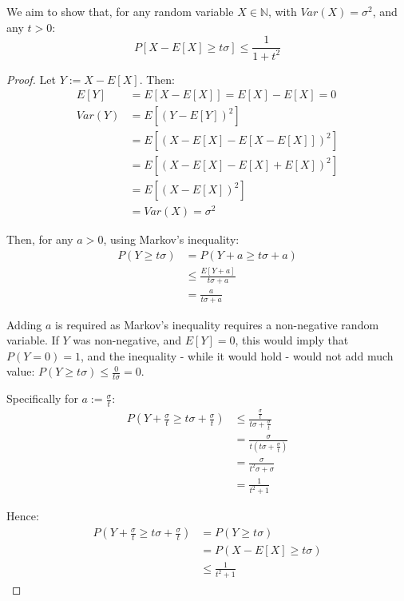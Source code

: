 \documentclass[a4paper]{scrreprt}
\begin{document}
We aim to show that, for any random variable $X \in \mathbb{N}$, with $Var(X) = \sigma^2$, and any $t > 0$:
\[
	P[X - E[X] \geq t \sigma] \leq \frac{1}{1 + t^2}
\]

\begin{proof}
	Let $Y := X - E[X]$. Then:
	\begin{align*}
		E[Y] & = E[X - E[X]] = E[X] - E[X] = 0 \\
		Var(Y) & = E[(Y - E[Y])^2] \\
		       & = E[(X - E[X] - E[X - E[X]])^2] \\
		       & = E[(X - E[X] - E[X] + E[X])^2] \\
		       & = E[(X - E[X])^2] \\
		       & = Var(X) = \sigma^2
	\end{align*}

	Then, for any $a > 0$, using Markov's inequality:
	\begin{align*}
		P(Y \geq t \sigma) & = P(Y + a \geq t \sigma + a) \\
				   & \leq \frac{E[Y + a]}{t \sigma + a} \\
		     & = \frac{a}{t \sigma + a}
	\end{align*}

	Adding $a$ is required as Markov's inequality requires a non-negative
	random variable. If $Y$ was non-negative, and $E[Y] = 0$, this would
	imply that $P(Y = 0) = 1$, and the inequality - while it would hold -
	would not add much value: $P(Y \geq t \sigma) \leq \frac{0}{t \sigma} = 0$.

	Specifically for $a := \frac{\sigma}{t}$:
	\begin{align*}
		P(Y + \frac{\sigma}{t} \geq t \sigma + \frac{\sigma}{t}) & \leq \frac{\frac{\sigma}{t}}{t \sigma + \frac{\sigma}{t}} \\
		& = \frac{\sigma}{t (t \sigma + \frac{\sigma}{t})} \\
		& = \frac{\sigma}{t^2 \sigma + \sigma} \\
		& = \frac{1}{t^2 + 1}
	\end{align*}

	Hence:
	\begin{align*}
		P(Y + \frac{\sigma}{t} \geq t \sigma + \frac{\sigma}{t}) & = P(Y \geq t \sigma) \\
		& = P(X - E[X] \geq t \sigma) \\
		& \leq \frac{1}{t^2 + 1}
	\end{align*}
\end{proof}
\end{document}
